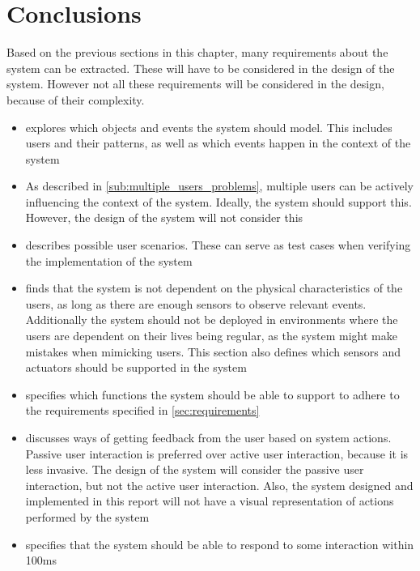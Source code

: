 \section{Conclusions}

Based on the previous sections in this chapter, many requirements about the system can be extracted. These will have to be considered in the design of the system. However not all these requirements will be considered in the design, because of their complexity.

\begin{itemize}
\item {} explores which objects and events the system should model. This includes users and their patterns, as well as which events happen in the context of the system
\item As described in \cref{sub:multiple_users_problems}, multiple users can be actively influencing the context of the system. Ideally, the system should support this. However, the design of the system will not consider this
\item {} describes possible user scenarios. These can serve as test cases when verifying the implementation of the system
\item {} finds that the system is not dependent on the physical characteristics of the users, as long as there are enough sensors to observe relevant events. Additionally the system should not be deployed in environments where the users are dependent on their lives being regular, as the system might make mistakes when mimicking users. This section also defines which sensors and actuators should be supported in the system
\item {} specifies which functions the system should be able to support to adhere to the requirements specified in \cref{sec:requirements}
\item {} discusses ways of getting feedback from the user based on system actions. Passive user interaction is preferred over active user interaction, because it is less invasive. The design of the system will consider the passive user interaction, but not the active user interaction. Also, the system designed and implemented in this report will not have a visual representation of actions performed by the system
\item {} specifies that the system should be able to respond to some interaction within 100ms
\end{itemize}
